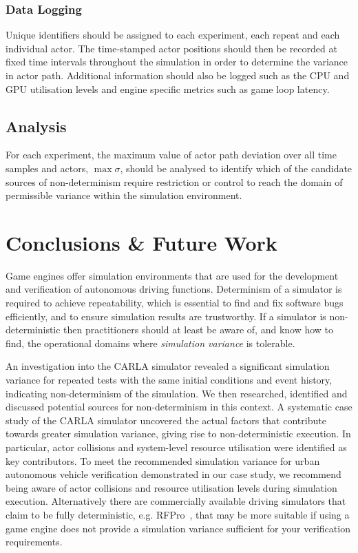 \subsubsection{Data Logging}
Unique identifiers should be assigned to each experiment, each repeat and each individual actor. 
The time-stamped actor positions should then be recorded at fixed time intervals throughout the simulation in order to determine the variance in actor path. Additional information should also be logged such as the CPU and GPU utilisation levels and engine specific metrics such as game loop latency.

\subsection{Analysis}
For each experiment, the maximum value of actor path deviation over all time samples and actors, $\max\sigma$, should be analysed to identify which of the candidate sources of non-determinism require restriction or control to reach the domain of permissible variance within the simulation environment. 

\section{Conclusions \& Future Work}\label{s:conclusion}

Game engines offer simulation environments that are used for the development and verification of autonomous driving functions. Determinism of a simulator is required to achieve repeatability, which is essential to find and fix software bugs efficiently, and to ensure simulation results are trustworthy. If a simulator is non-deterministic then practitioners should at least be aware of, and know how to find, the operational domains where \textit{simulation variance} is tolerable. 

An investigation into the CARLA simulator revealed a significant simulation variance for repeated tests with the same initial conditions and event history, indicating non-determinism of the simulation. We then researched, identified and discussed potential sources for non-determinism in this context. A systematic case study of the CARLA simulator uncovered the actual factors that contribute towards greater simulation variance, giving rise to non-deterministic execution. In particular, actor collisions and system-level resource utilisation were identified as key contributors. To meet the recommended simulation variance for urban autonomous vehicle verification demonstrated in our case study, we recommend being aware of actor collisions and resource utilisation levels during simulation execution. Alternatively there are commercially available driving simulators that claim to be fully deterministic, e.g. RFPro~\cite{rFpro2021}, that may be more suitable if using a game engine does not provide a simulation variance sufficient for your verification requirements.

